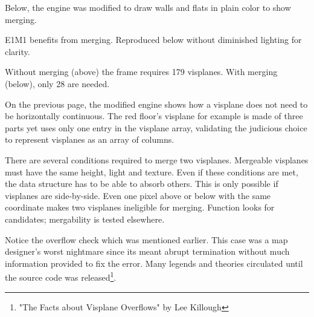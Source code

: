 
\vspace{4pt}

Below, the engine was modified to draw walls and flats in plain color to show merging.

\vspace{5pt}




 \label{complex_scene_plain_light.png}



E1M1 benefits from merging. Reproduced below without diminished lighting for clarity.

\vspace{2mm}





Without merging (above) the frame requires 179 visplanes. With merging (below), only 28 are needed.

\vspace{2mm}
\par \pagebreak
On the previous page, the modified engine shows how a visplane does not need to be horizontally continuous. The red floor's visplane for example is made of three parts yet uses only one entry in the visplane array, validating the judicious choice to represent visplanes as an array of columns.\\
\par
There are several conditions required to merge two visplanes. Mergeable visplanes must have the same height, light and texture. Even if these conditions are met, the data structure has to be able to absorb others. This is only possible if visplanes are side-by-side. Even one pixel above or below with the same  coordinate makes two visplanes ineligible for merging. Function  looks for candidates; mergability is tested elsewhere.\\
\par
{}
\par
Notice the overflow check which was mentioned earlier. This case was a map designer's worst nightmare since its meant abrupt termination without much information provided to fix the error. Many legends and theories circulated until the source code was released\footnote{"The Facts about Visplane Overflows" by Lee Killough}.





